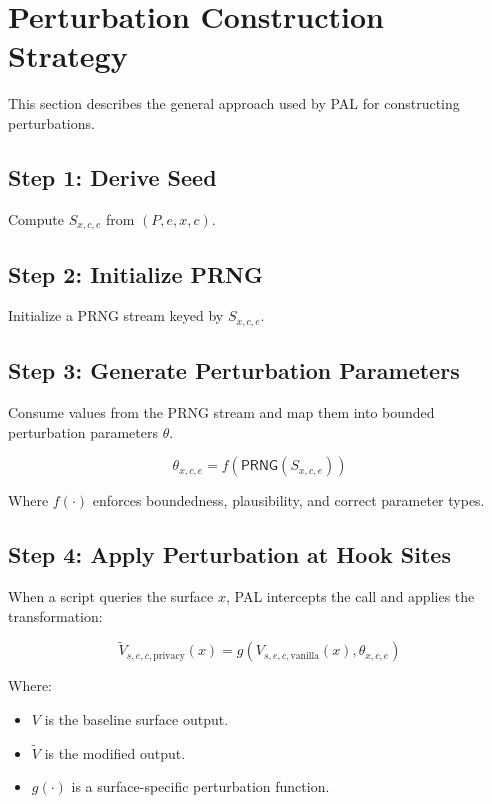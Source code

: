 \documentclass[11pt]{report}
\begin{document}
\section{Perturbation Construction Strategy}

This section describes the general approach used by PAL for constructing perturbations.

\subsection{Step 1: Derive Seed}

Compute $S_{x,c,e}$ from $(P,e,x,c)$.

\subsection{Step 2: Initialize PRNG}

Initialize a PRNG stream keyed by $S_{x,c,e}$.

\subsection{Step 3: Generate Perturbation Parameters}

Consume values from the PRNG stream and map them into bounded perturbation parameters $\theta$.

\[
\theta_{x,c,e} = f\left(\mathsf{PRNG}(S_{x,c,e})\right)
\]

Where $f(\cdot)$ enforces boundedness, plausibility, and correct parameter types.

\subsection{Step 4: Apply Perturbation at Hook Sites}

When a script queries the surface $x$, PAL intercepts the call and applies the transformation:

\[
\widetilde{V}_{s,e,c,\text{privacy}}(x) = g\left(V_{s,e,c,\text{vanilla}}(x), \theta_{x,c,e}\right)
\]

Where:
\begin{itemize}
    \item $V$ is the baseline surface output.
    \item $\widetilde{V}$ is the modified output.
    \item $g(\cdot)$ is a surface-specific perturbation function.
\end{itemize}
\end{document}
